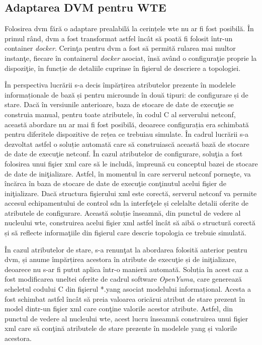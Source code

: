 \subsection{Adaptarea DVM pentru WTE}

Folosirea \gls{dvm} fără o adaptare prealabilă la cerințele \gls{wte} nu ar fi fost posibilă. În primul rând, \gls{dvm} a fost transformat astfel încât să poată fi folosit într-un container \textit{docker}. Cerinţa pentru \gls{dvm} a fost să permită rularea mai multor instanţe, fiecare în containerul \textit{docker} asociat, însă având o configuraţie proprie la dispoziţie, în funcție de detaliile cuprinse în fişierul de descriere a topologiei.

În perspectiva lucrării s-a decis împărțirea atributelor prezente în modelele informaționale de bază și pentru microunde în două tipuri: de configurare și de stare. Dacă în versiunile anterioare, baza de stocare de date de execuţie se construia manual, pentru toate atributele, în codul C al serverului \gls{netconf}, această abordare nu ar mai fi fost posibilă, deoarece configurația era schimbată pentru diferitele dispozitive de rețea ce trebuiau simulate. În cadrul lucrării s-a dezvoltat astfel o soluție automată care să construiască această bază de stocare de date de execuţie \gls{netconf}. În cazul atributelor de configurare, soluţia a fost folosirea unui fişier \gls{xml} care să le includă, împreună cu conceptul bazei de stocare de date de iniţializare. Astfel, în momentul în care serverul \gls{netconf} porneşte, va încărca în baza de stocare de date de execuţie conţinutul acelui fişier de iniţializare. Dacă structura fişierului \gls{xml} este corectă, serverul \gls{netconf} va permite accesul echipamentului de control \gls{sdn} la interfeţele și celelalte detalii oferite de atributele de configurare. Această soluție înseamnă, din punctul de vedere al nucleului \gls{wte}, construirea acelui fişier \gls{xml} astfel încât să aibă o structură corectă și să reflecte informaţiile din fişierul care descrie topologia ce trebuie simulată.

În cazul atributelor de stare, s-a renunţat la abordarea folosită anterior pentru \gls{dvm}, și anume împărțirea acestora în atribute de execuţie și de iniţializare, deoarece nu s-ar fi putut aplica într-o manieră automată. Soluția în acest caz a fost modificarea uneltei oferite de cadrul software \textit{OpenYuma}, care generează scheletul codului C din fişierul *.yang asociat modelului informațional. Acesta a fost schimbat astfel încât să preia valoarea oricărui atribut de stare prezent în model dintr-un fişier \gls{xml} care conţine valorile acestor atribute. Astfel, din punctul de vedere al nucleului \gls{wte}, acest lucru înseamnă construirea unui fişier \gls{xml} care să conţină atributele de stare prezente în modelele \gls{yang} și valorile acestora.

